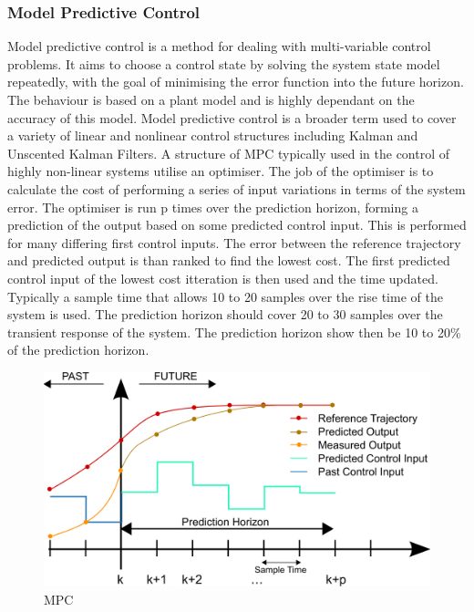 \documentclass[11pt,a4paper]{article}
\begin{document}
\subsubsection{Model Predictive Control}
\label{sub:model_predictive_control}
Model predictive control is a method for dealing with multi-variable control problems. It aims to choose a control state by solving the system state model repeatedly, with the goal of minimising the error function into the future horizon. The behaviour is based on a plant model and is highly dependant on the accuracy of this model. Model predictive control is a broader term used to cover a variety of linear and nonlinear control structures including Kalman and Unscented Kalman Filters.\newline
A structure of MPC typically used in the control of highly non-linear systems utilise an optimiser. The job of the optimiser is to calculate the cost of performing a series of input variations in terms of the system error. The optimiser is run p times over the prediction horizon, forming a prediction of the output based on some predicted control input. This is performed for many differing first control inputs. The error between the reference trajectory and predicted output is than ranked to find the lowest cost. The first predicted control input of the lowest cost itteration is then used and the time updated. Typically a sample time that allows 10 to 20 samples over the rise time of the system is used. The prediction horizon should cover 20 to 30 samples over the transient response of the system. The prediction horizon show then be 10 to 20\% of the prediction horizon.\newline

\begin{figure}[!hbt]
    \centering
    \includegraphics[scale=0.15]{MPC.png}
    \caption{MPC}
    \label{fig:mpc_chart}
\end{figure}
\end{document}
